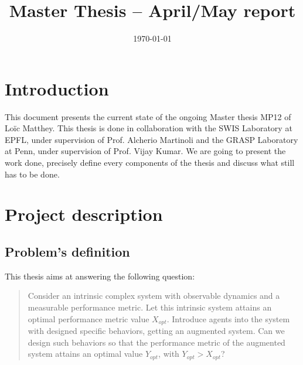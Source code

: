 \documentclass[letterpaper, oneside]{article}
\title{Master Thesis -- April/May report}
\date{\today}
\author{\loic}
\begin{document}
\maketitle

% 
% 
% 
% 



\section{Introduction} %
\label{sec:introduction}
This document presents the current state of the ongoing Master thesis MP12 of Loïc Matthey. This thesis is done in collaboration with the SWIS Laboratory at EPFL, under supervision of Prof. Alcherio Martinoli and the GRASP Laboratory at Penn, under supervision of Prof. Vijay Kumar. We are going to present the work done, precisely define every components of the thesis and discuss what still has to be done.

\section{Project description} %
\label{sec:project_description}

\subsection{Problem's definition} %
\label{sub:problem_s_definition}
This thesis aims at answering the following question:

\begin{quote}
Consider an intrinsic complex system with observable dynamics and a measurable performance metric. Let this intrinsic system attains an optimal performance metric value $X_{opt}$. Introduce agents into the system with designed specific behaviors, getting an augmented system. Can we design such behaviors so that the performance metric of the augmented system attains an optimal value $Y_{opt}$, with $Y_{opt} > X_{opt}$?
\end{quote}
\end{document}
